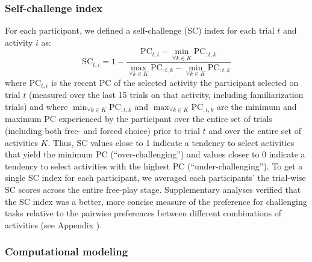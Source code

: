 \subsubsection{Self-challenge index}\label{CH4_SSS_self_challenge_index}
For each participant, we defined a self-challenge (SC) index for each trial $t$ and activity $i$ as: 
\begin{equation}\label{eq:sc}
    \text{SC}_{t,i} = 1-\frac{\text{PC}_{t,i}-\min\limits_{\forall k \in K}\text{PC}_{:t,k}}{\max\limits_{\forall k \in K}\text{PC}_{:t,k}-\min\limits_{\forall k \in K}\text{PC}_{:t,k}}
\end{equation}
where $\text{PC}_{t,i}$ is the recent \ac{PC} of the selected activity the participant selected on trial $t$ (measured over the last 15 trials on that activity, including familiarization trials) and where $\min\nolimits_{\forall k \in K}\text{PC}_{:t,k}$ and $\max\nolimits_{\forall k \in K}\text{PC}_{:t,k}$ are the minimum and maximum \ac{PC} experienced by the participant over the entire set of trials (including both free- and forced choice) prior to trial $t$ and over the entire set of activities $K$. Thus, \ac{SC} values close to 1 indicate a tendency to select activities that yield the minimum \ac{PC} (“over-challenging”) and values closer to 0 indicate a tendency to select activities with the highest \ac{PC} (“under-challenging”). To get a single \ac{SC} index for each participant, we averaged each participants' the trial-wise \ac{SC} scores across the entire free-play stage. Supplementary analyses verified that the \ac{SC} index was a better, more concise measure of the preference for challenging tasks relative to the pairwise preferences between different combinations of activities (see Appendix ). 

\subsubsection{Computational modeling}\label{CH4_SSS_computational_modeling} 

